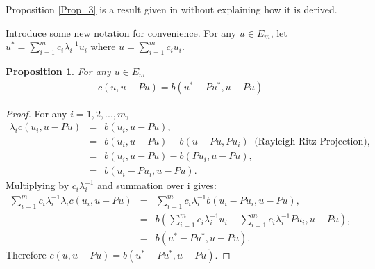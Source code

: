 \documentclass[../../main.tex]{subfiles}
\begin{document}
Proposition \ref{Prop_3} is a result given in \cite{SF73} without explaining how it is derived.

Introduce some new notation for convenience. For any $u \in E_{m}$, let $u^{*} = \sum_{i=1}^{m} c_{i}\lambda_{i}^{-1}u_{i}$ where $u = \sum_{i=1}^{m} c_{i}u_{i}$.

\newtheorem{Prop_4}[Prop_1]{Proposition} 
\begin{Prop_4}
	\label{Prop_4}
	For any $u \in E_{m}$
		\begin{eqnarray*}
		c( u, u - Pu ) = b(u^{*} - Pu^{*}, u -Pu)
		\end{eqnarray*}
\end{Prop_4}
\begin{proof}
	For any $i = 1,2,...,m$,
	\begin{eqnarray*}
	\lambda_{i}c( u_{i},u-Pu ) &=&  b(u_{i}, u-Pu),\\
								&=& b(u_{i}, u-Pu) - b(u-Pu,Pu_{i}) \ \textrm{ (Rayleigh-Ritz Projection)},\\
								&=&  b(u_{i}, u-Pu) - b(Pu_{i},u-Pu),\\
								&=&  b(u_{i}-Pu_{i}, u-Pu).
	\end{eqnarray*}
	Multiplying by $c_{i}\lambda_{i}^{-1}$ and summation over i gives:
	\begin{eqnarray*}
	\sum_{i=1}^{m} c_{i}\lambda_{i}^{-1}\lambda_{i}c( u_{i},u-Pu ) &=& \sum_{i=1}^{m} c_{i}\lambda_{i}^{-1}b(u_{i}-Pu_{i}, u-Pu),\\
								&=& b(\sum_{i=1}^{m} c_{i}\lambda_{i}^{-1}u_{i}-\sum_{i=1}^{m} c_{i}\lambda_{i}^{-1}Pu_{i}, u-Pu),\\
										&=& b(u^{*}-Pu^{*}, u-Pu).
	\end{eqnarray*}
	Therefore $c( u,u-Pu ) = b(u^{*}-Pu^{*}, u-Pu)$.
\end{proof}
\end{document}
